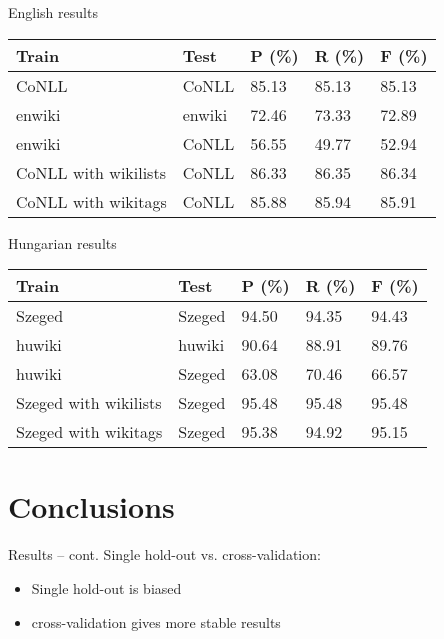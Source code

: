\documentclass[utf8x]{beamer}
\newcommand{\vitem}{\vfill \item}
\begin{document}
\begin{frame}{English results}

\begin{center}
\begin{tabular}{lllll}
\hline \bf Train & \bf Test & \bf P (\%) & \bf R (\%) & \bf F (\%) \\ \hline
CoNLL & CoNLL & 85.13 & 85.13 & 85.13 \\
enwiki & enwiki & 72.46 & 73.33 &  72.89 \\
enwiki & CoNLL & 56.55 & 49.77 & 52.94 \\
CoNLL with wikilists & CoNLL & 86.33 & 86.35 & 86.34 \\
CoNLL with wikitags & CoNLL & 85.88 & 85.94 & 85.91 \\
\hline
\end{tabular}
\end{center}

\end{frame}

\begin{frame}{Hungarian results}

\begin{center}
\begin{tabular}{lllll}
\hline \bf Train & \bf Test & \bf P (\%) & \bf R (\%) & \bf F (\%) \\ \hline
Szeged  & Szeged  & 94.50 & 94.35 & 94.43 \\
huwiki & huwiki & 90.64 & 88.91 &  89.76 \\
huwiki & Szeged  & 63.08 & 70.46 & 66.57 \\
Szeged  with wikilists & Szeged  & 95.48 & 95.48 & 95.48 \\
Szeged  with wikitags & Szeged  & 95.38 & 94.92 & 95.15 \\
\hline
\end{tabular}
\end{center}


\end{frame}

\section{Conclusions}
\begin{frame}{Results -- cont.}
  Single hold-out vs. cross-validation:
  \begin{itemize}
  \vitem Single hold-out is biased
  \vitem cross-validation gives more stable results
  \end{itemize}
  \vfill
\end{frame}
\end{document}
